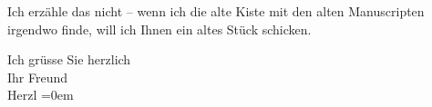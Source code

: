 \pstart
           Ich erzähle das nicht
                  \label{K_L03826-5v}\label{K_L03826-5}{ }– wenn ich die alte Kiste mit
               den alten Manuscripten irgendwo finde, will ich Ihnen ein altes Stück schicken.\pend
           
\pstart
           Ich grüsse Sie herzlich{\\[\baselineskip]} Ihr Freund{\\[\baselineskip]}\spacefill\mbox{Herzl}\pend
           \leftskip=0em{}\endnumbering{}  \newcommand{\dateiname}{L03826}\newcommand{\titel}{Theodor Herzl an Arthur Schnitzler, 2. 1. 1893}\newcommand{\editorInnen}{Selma Jahnke und Martin Anton Müller}
